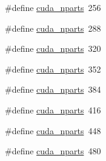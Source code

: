 \begin{DoxyCompactItemize}
\item 
\#define \hyperlink{runner__cuda_8cu_a73a9582f0db5b61423deb6c2e5ade9e8}{cuda\-\_\-nparts}~256
\item 
\#define \hyperlink{runner__cuda_8cu_a73a9582f0db5b61423deb6c2e5ade9e8}{cuda\-\_\-nparts}~288
\item 
\#define \hyperlink{runner__cuda_8cu_a73a9582f0db5b61423deb6c2e5ade9e8}{cuda\-\_\-nparts}~320
\item 
\#define \hyperlink{runner__cuda_8cu_a73a9582f0db5b61423deb6c2e5ade9e8}{cuda\-\_\-nparts}~352
\item 
\#define \hyperlink{runner__cuda_8cu_a73a9582f0db5b61423deb6c2e5ade9e8}{cuda\-\_\-nparts}~384
\item 
\#define \hyperlink{runner__cuda_8cu_a73a9582f0db5b61423deb6c2e5ade9e8}{cuda\-\_\-nparts}~416
\item 
\#define \hyperlink{runner__cuda_8cu_a73a9582f0db5b61423deb6c2e5ade9e8}{cuda\-\_\-nparts}~448
\item 
\#define \hyperlink{runner__cuda_8cu_a73a9582f0db5b61423deb6c2e5ade9e8}{cuda\-\_\-nparts}~480
\end{DoxyCompactItemize}
